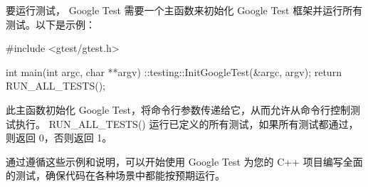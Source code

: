 要运行测试， Google Test 需要一个主函数来初始化 Google Test 框架并运行所有测试。以下是示例：

\begin{cpp}
#include <gtest/gtest.h>

int main(int argc, char **argv) {
    ::testing::InitGoogleTest(&argc, argv);
    return RUN_ALL_TESTS();
}
\end{cpp}

此主函数初始化 Google Test，将命令行参数传递给它，从而允许从命令行控制测试执行。 RUN\_ALL\_TESTS() 运行已定义的所有测试，如果所有测试都通过，则返回 0，否则返回 1。

通过遵循这些示例和说明，可以开始使用 Google Test 为您的 C++ 项目编写全面的测试，确保代码在各种场景中都能按预期运行。
